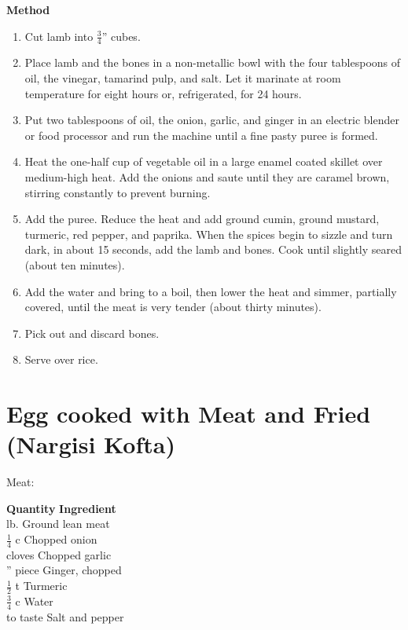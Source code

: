 {\bf Method}
\begin{enumerate}
   \item Cut lamb into $\frac{3}{4}$'' cubes.
   \item Place lamb and the  bones  in  a  non-metallic  bowl  with  the  four
      tablespoons  of  oil,  the  vinegar, tamarind pulp, and salt.  Let it
      marinate at room temperature for eight hours  or,  refrigerated,  for
      24 hours.
   \item Put  two  tablespoons of oil, the onion, garlic, and ginger in
      an electric blender or food processor and  run  the
      machine until a fine pasty puree is formed.
   \item Heat  the  one-half  cup  of  vegetable oil in a large enamel coated
      skillet over medium-high heat.  Add the onions and saute until  they
      are caramel brown, stirring constantly to prevent burning.
   \item Add  the  puree.    Reduce  the  heat  and  add ground cumin, ground
      mustard, turmeric, red pepper, and paprika.  When the spices begin to
      sizzle  and  turn dark, in about 15 seconds, add the lamb and bones.
      Cook until slightly seared (about ten minutes).
   \item Add the water and bring to a boil, then lower the heat  and  simmer,
      partially  covered,  until  the  meat  is  very tender (about thirty
      minutes).
   \item Pick out and discard bones.
   \item Serve over rice.
\end{enumerate}

\section{Egg cooked with Meat and Fried (Nargisi Kofta)}

Meat:
\begin{tabbing}
\hspace{1.0cm}  \={\bf Quantity}   \hspace{3.0cm} \={\bf Ingredient}\\
 lb. 		\>Ground lean meat\\
\>$\frac{1}{4}$ c 	\>Chopped onion\\
 cloves 		\>Chopped garlic\\
'' piece		\>Ginger, chopped\\
\>$\frac{1}{2}$ t 	\>Turmeric\\
\>$\frac{3}{4}$ c 	\>Water\\
\>to taste 		\>Salt and pepper \\
\end{tabbing}

